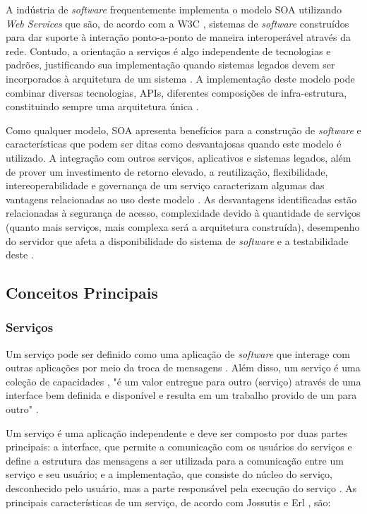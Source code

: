 A indústria de \textit{software} frequentemente implementa o modelo SOA utilizando \textit{Web Services} que são, de acordo com a W3C \cite{haas_web_2004}, sistemas de \textit{software} construídos para dar suporte à interação ponto-a-ponto de maneira interoperável através da rede. Contudo, a orientação a serviços é algo independente de tecnologias e padrões, justificando sua implementação quando sistemas legados devem ser incorporados à arquitetura de um sistema \cite{linthicum_soainrealworld_2007}. A implementação deste modelo pode combinar diversas tecnologias, APIs, diferentes composições de infra-estrutura, constituindo sempre uma arquitetura única \cite{erl_orientacaoaservico_2009}.

Como qualquer modelo, SOA apresenta benefícios para a construção de \textit{software} e características que podem ser ditas como desvantajosas quando este modelo é utilizado. A integração com outros serviços, aplicativos e sistemas legados, além de prover um investimento de retorno elevado, a reutilização, flexibilidade, intereoperabilidade e governança de um serviço caracterizam algumas das vantagens relacionadas ao uso deste modelo \cite{oqueesoa_2010} \cite{vantagens_desvantagens_soa}. As desvantagens identificadas estão relacionadas à segurança de acesso, complexidade devido à quantidade de serviços (quanto mais serviços, mais complexa será a arquitetura construída), desempenho do servidor que afeta a disponibilidade do sistema de \textit{software} e a testabilidade deste \cite{oqueesoa_2010} \cite{vantagens_desvantagens_soa}.

\subsection{Conceitos Principais}
\subsubsection{Serviços}

Um serviço pode ser definido como uma aplicação de \textit{software} que interage com outras aplicações por meio da troca de mensagens \cite{linthicum_soainrealworld_2007}. Além disso, um serviço é uma coleção de capacidades \cite{erl_orientacaoaservico_2009}, "é um valor entregue para outro (serviço) através de uma interface bem definida e disponível e resulta em um trabalho provido de um para outro" \cite{adaptive_ltd_service_2009}.

Um serviço é uma aplicação independente e deve ser composto por duas partes principais: a interface, que permite a comunicação com os usuários do serviços e define a estrutura das mensagens a ser utilizada para a comunicação entre um serviço e seu usuário; e a implementação, que consiste do núcleo do serviço, desconhecido pelo usuário, mas a parte responsável pela execução do serviço \cite{linthicum_soainrealworld_2007}. As principais características de um serviço, de acordo com Jossutis \cite{josuttis_soa_2007} e Erl \cite{erl_orientacaoaservico_2009}, são:

